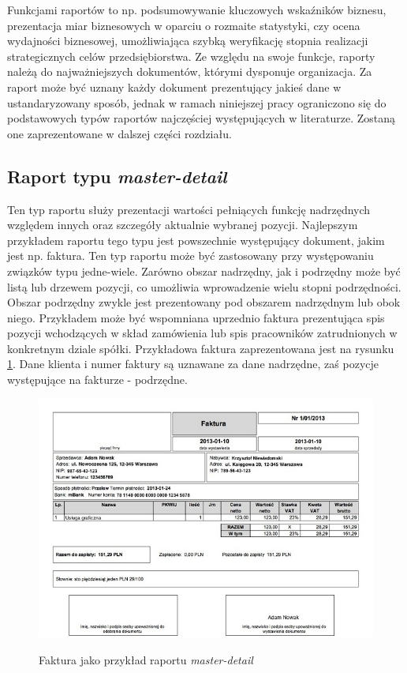 \documentclass[11pt,a4paper]{article}
\begin{document}
Funkcjami raportów to np. podsumowywanie kluczowych wskaźników biznesu, prezentacja miar biznesowych w oparciu o rozmaite statystyki, czy ocena wydajności biznesowej, umożliwiająca szybką weryfikację stopnia realizacji strategicznych celów przedsiębiorstwa. Ze względu na swoje funkcje, raporty należą do najważniejszych dokumentów, którymi dysponuje organizacja. 
Za raport może być uznany każdy dokument prezentujący jakieś dane w ustandaryzowany sposób, jednak w ramach niniejszej pracy ograniczono się do podstawowych typów raportów najczęściej występujących w literaturze. Zostaną one zaprezentowane w dalszej części rozdziału.

\subsection{Raport typu \emph{master-detail}} \label{teoria:md}
Ten typ raportu służy prezentacji wartości pełniących funkcję nadrzędnych względem innych oraz szczegóły aktualnie wybranej pozycji. Najlepszym przykładem raportu tego typu jest powszechnie występujący dokument, jakim jest np. faktura. Ten typ raportu może być zastosowany przy występowaniu związków typu jedne-wiele. Zarówno obszar nadrzędny, jak i podrzędny może być listą lub drzewem pozycji, co umożliwia wprowadzenie wielu stopni podrzędności. Obszar podrzędny zwykle jest prezentowany pod obszarem nadrzędnym lub obok niego. Przykładem może być wspomniana uprzednio faktura prezentująca spis pozycji wchodzących w skład zamówienia lub spis pracowników zatrudnionych w konkretnym dziale spółki. Przykładowa faktura zaprezentowana jest na rysunku \ref{img:faktura}. Dane klienta i numer faktury są uznawane za dane nadrzędne, zaś pozycje występujące na fakturze - podrzędne. 

\begin{figure}[h]
\centering
\caption{Faktura jako przykład raportu \emph{master-detail}}
\includegraphics[scale=0.80]{faktura_vat_pdf}
\label{img:faktura}
\end{figure}
\end{document}
